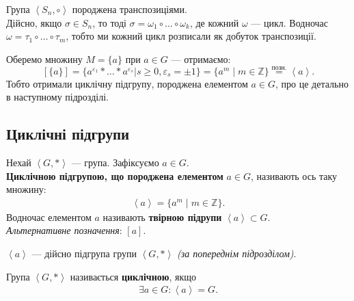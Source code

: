 \documentclass{math_library}
\begin{document}
\begin{example}
Група $\left< S_n, \circ \right>$ породжена транспозиціями.
\bigskip \\
Дійсно, якщо $\sigma \in S_n$, то тоді $\sigma = \omega_1 \circ \dots \circ \omega_k$, де кожний $\omega$ --- цикл. Водночас $\omega = \tau_1 \circ \dots \circ \tau_m$, тобто ми кожний цикл розписали як добуток транспозиції. 
\end{example}

\begin{example}
Оберемо множину $M = \{a\}$ при $a \in G$ --- отримаємо:
\[
[\{a\}] = \{ a^{\varepsilon_1}* \dots * a^{\varepsilon_s} | s \geq 0, \varepsilon_s = \pm 1 \} = \{ a^m \mid m \in \mathbb{Z} \} \overset{\text{позн.}}{=} \left<a\right>.
\]
Тобто отримали циклічну підгрупу, породжена елементом $a \in G$, про це детально в наступному підрозділі.
\end{example}

\subsection{Циклічні підгрупи}
\begin{definition}
Нехай $\left<G,* \right>$ --- група. Зафіксуємо $a \in G$.\\
\textbf{Циклічною підгрупою, що породжена елементом} $a \in G$, називають ось таку множину:
\begin{align*}
\left<a\right> = \{ a^m \mid m \in \mathbb{Z} \}.
\end{align*}
Водночас елементом $a$ називають \textbf{твірною підрупи} $\left<a\right> \subset G$.\\
\textit{Альтернативне позначення}: $\left[ a \right]$.
\end{definition}

\begin{remark}
$\left<a\right>$ --- дійсно підгрупа групи $\left<G,* \right>$ \textit{(за попереднім підрозділом)}.
\end{remark}

\begin{definition}
Група $\left<G,*\right>$ називається \textbf{циклічною}, якщо
\begin{align*}
\exists a \in G: \left<a\right> = G.
\end{align*}
\end{definition}
\end{document}

